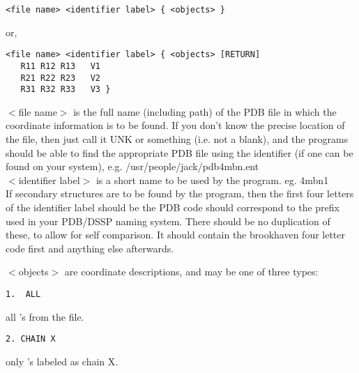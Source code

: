 \begin{scriptsize}\begin{verbatim}
<file name> <identifier label> { <objects> }
\end{verbatim} \end{scriptsize}

or,\\

\begin{scriptsize}\begin{verbatim}
<file name> <identifier label> { <objects> [RETURN]
   R11 R12 R13   V1
   R21 R22 R23   V2
   R31 R32 R33   V3 }
\end{verbatim} \end{scriptsize}

$<$file name$>$ is the full name (including path) of the PDB file in
which the coordinate information is to be found.  If you don't know the 
precise location of the file, then just call it UNK or something (i.e. 
not a blank), and the programs should be able to find the appropriate PDB 
file using the identifier (if one can be found on your system), e.g. 
/usr/people/jack/pdb4mbn.ent\\

$<$identifier label$>$ is a short name to be used by the program. 
eg. 4mbn1\\

If secondary structures are to be found by the program, then the
first  four letters of the identifier label should be the PDB code should
correspond to the prefix used in your PDB/DSSP naming system.
There should be no 
duplication of these, to allow for self comparison.  It should
contain  the brookhaven four letter code first and anything else 
afterwards.

$<$objects$>$ are coordinate descriptions, and may be one of three types:

\begin{scriptsize}\begin{verbatim}
1.  ALL  
\end{verbatim} \end{scriptsize}
all \Cal's from the file.\\

\begin{scriptsize}\begin{verbatim}
2. CHAIN X 
\end{verbatim} \end{scriptsize}
only \Cal's labeled as chain X.\\

